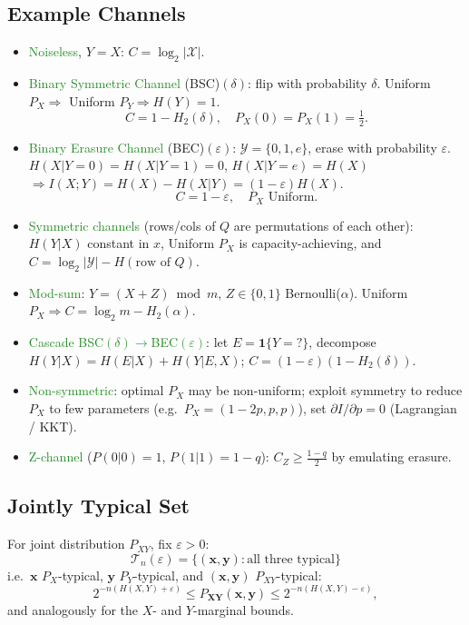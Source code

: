 \subsection{Example Channels}
\begin{itemize}
  \item \textcolor{ForestGreen}{Noiseless}, $Y=X$: $C=\log_2|\mathcal X|$.
  \item \textcolor{ForestGreen}{Binary Symmetric Channel} (BSC)$(\delta)$: flip with probability $\delta$.
    Uniform $P_X\Rightarrow$ Uniform $P_Y\Rightarrow H(Y)=1$.
    \[C=1-H_2(\delta),\quad P_X(0)=P_X(1)=\tfrac12.\]
  \item \textcolor{ForestGreen}{Binary Erasure Channel} (BEC)$(\varepsilon)$: $\mathcal Y=\{0,1,e\}$, erase with probability $\varepsilon$.
    $H(X|Y\!=\!0)=H(X|Y\!=\!1)=0$, $H(X|Y\!=\!e)=H(X)$\\
    $\Rightarrow I(X;Y)=H(X)-H(X|Y)=(1-\varepsilon)H(X)$.
    \[C=1-\varepsilon,\quad P_X\text{ Uniform}.\]
  \item \textcolor{ForestGreen}{Symmetric channels} (rows/cols of $Q$ are permutations of each
    other): $H(Y|X)$ constant in $x$, Uniform $P_X$ is capacity-achieving, and
    $C=\log_2|\mathcal Y|-H(\text{row of }Q)$.
  \item \textcolor{ForestGreen}{Mod-sum}: $Y=(X+Z)\bmod m$, $Z\in\{0,1\}$ Bernoulli($\alpha$). Uniform $P_X\Rightarrow C=\log_2 m-H_2(\alpha)$.
  \item \textcolor{ForestGreen}{Cascade BSC$(\delta)\!\to\!$BEC$(\varepsilon)$}: let $E=\mathbf 1\{Y{=}?\}$, decompose $H(Y|X)=H(E|X)+H(Y|E,X)$; $C=(1{-}\varepsilon)(1{-}H_2(\delta))$.
  \item \textcolor{ForestGreen}{Non-symmetric}: optimal $P_X$ may be non-uniform; exploit symmetry to reduce $P_X$ to few parameters (e.g.\ $P_X{=}(1{-}2p,p,p)$), set $\partial I/\partial p=0$ (Lagrangian / KKT).
  \item \textcolor{ForestGreen}{Z-channel} ($P(0|0){=}1$, $P(1|1){=}1{-}q$): $C_Z\ge\tfrac{1-q}{2}$ by emulating erasure.
\end{itemize}

\subsection{Jointly Typical Set}
For joint distribution $P_{XY}$, fix $\varepsilon>0$:
\[\mathcal T_n(\varepsilon)=\Big\{(\mathbf x,\mathbf y): \text{all three typical}\Big\}\]
i.e.\ $\mathbf x$ $P_X$-typical, $\mathbf y$ $P_Y$-typical, and $(\mathbf x,\mathbf y)$
$P_{XY}$-typical:
\[2^{-n(H(X,Y)+\varepsilon)}\le P_{\mathbf{XY}}(\mathbf x,\mathbf y)\le 2^{-n(H(X,Y)-\varepsilon)},\]
and analogously for the $X$- and $Y$-marginal bounds.
